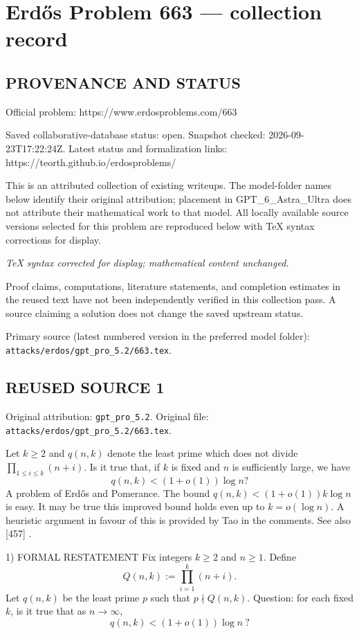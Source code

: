 \section*{Erd\H{o}s Problem 663 --- collection record}

\subsection*{PROVENANCE AND STATUS}
Official problem: https://www.erdosproblems.com/663

Saved collaborative-database status: open.
Snapshot checked: 2026-09-23T17:22:24Z.
Latest status and formalization links: https://teorth.github.io/erdosproblems/

This is an attributed collection of existing writeups. The model-folder names below identify their original attribution; placement in GPT\_6\_Astra\_Ultra does not attribute their mathematical work to that model. All locally available source versions selected for this problem are reproduced below with TeX syntax corrections for display.

\emph{TeX syntax corrected for display; mathematical content unchanged.}

Proof claims, computations, literature statements, and completion estimates in the reused text have not been independently verified in this collection pass. A source claiming a solution does not change the saved upstream status.

Primary source (latest numbered version in the preferred model folder): \texttt{attacks/erdos/gpt\_pro\_5.2/663.tex}.

\subsection*{REUSED SOURCE 1}
Original attribution: \texttt{gpt\_pro\_5.2}.
Original file: \texttt{attacks/erdos/gpt\_pro\_5.2/663.tex}.


Let $k\geq 2$ and $q(n,k)$ denote the least prime which does not divide $\prod_{1\leq i\leq k}(n+i)$. Is it true that, if $k$ is fixed and $n$ is sufficiently large, we have\[q(n,k)<(1+o(1))\log n?\] A problem of Erd\H{o}s and Pomerance. The bound $q(n,k)<(1+o(1))k\log n$ is easy. It may be true this improved bound holds even up to $k=o(\log n)$. A heuristic argument in favour of this is provided by Tao in the comments. See also [457] .


1) FORMAL RESTATEMENT
Fix integers $k\ge 2$ and $n\ge 1$. Define
\[
Q(n,k):=\prod_{i=1}^k (n+i).
\]
Let $q(n,k)$ be the least prime $p$ such that $p\nmid Q(n,k)$.
Question: for each fixed $k$, is it true that as $n\to\infty$,
\[
q(n,k) < (1+o(1))\log n\ ?
\]

